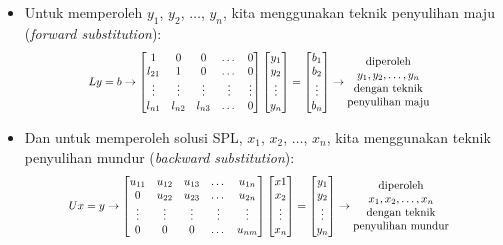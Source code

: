 \documentclass[pdflatex,compress,mathserif]{beamer}
\newcommand*{\Scale}[2][4]{\scalebox{#1}{$#2$}}%
\begin{document}
\begin{frame}
	\begin{itemize}
		\item Untuk memperoleh $ y_1 $, $ y_2 $, $\dots$, $ y_n $, kita menggunakan teknik penyulihan maju (\textit{forward substitution}):
		\[
		\Scale[0.8]{
			Ly = b \rightarrow \begin{bmatrix}
			1 & 0 & 0 & \dots & 0\\
			l_{21} & 1 & 0 & \dots & 0\\
			\vdots & \vdots & \vdots & \vdots & \vdots\\
			l_{n1} & l_{n2} & l_{n3} & \dots & 0\\
			\end{bmatrix}
			\begin{bmatrix}
			y_1 \\ y_2 \\ \vdots \\ y_n
			\end{bmatrix}
			=
			\begin{bmatrix}
			b_1 \\ b_2 \\ \vdots \\ b_n
			\end{bmatrix}
			\rightarrow 
			\begin{matrix}
			\text{diperoleh}& \\
			y_1 , y_2 ,\dots, y_n&\\
			\text{dengan teknik}&\\
			\text{penyulihan maju}&
			\end{matrix}
		}\]
		\item Dan untuk memperoleh solusi SPL, $ x_1 $, $ x_2 $, $ \dots $, $ x_n $, kita menggunakan teknik penyulihan mundur (\textit{backward substitution}):
		\[
		\Scale[0.8]{
			Ux = y \rightarrow \begin{bmatrix}
			u_{11} & u_{12} & u_{13} & \dots & u_{1n}\\
			0 & u_{22} & u_{23} & \dots & u_{2n}\\
			\vdots & \vdots & \vdots & \vdots & \vdots\\
			0 & 0 & 0 & \dots & u_{nm}\\
			\end{bmatrix}
			\begin{bmatrix}
			x1 \\ x_2 \\ \vdots \\ x_n
			\end{bmatrix}
			=
			\begin{bmatrix}
			y_1 \\ y_2 \\ \vdots \\ y_n
			\end{bmatrix}
			\rightarrow 
			\begin{matrix}
			\text{diperoleh}& \\
			x_1 , x_2 ,\dots, x_n&\\
			\text{dengan teknik}&\\
			\text{penyulihan mundur}&
			\end{matrix}
		}\]
	\end{itemize}
\end{frame}
\end{document}
